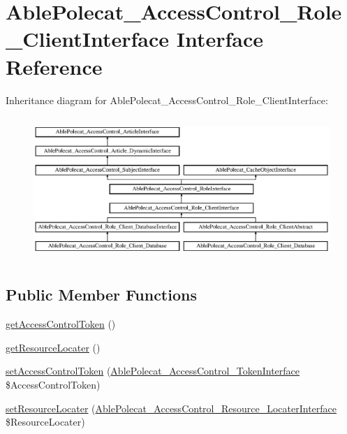 \hypertarget{interface_able_polecat___access_control___role___client_interface}{}\section{Able\+Polecat\+\_\+\+Access\+Control\+\_\+\+Role\+\_\+\+Client\+Interface Interface Reference}
\label{interface_able_polecat___access_control___role___client_interface}
Inheritance diagram for Able\+Polecat\+\_\+\+Access\+Control\+\_\+\+Role\+\_\+\+Client\+Interface\+:\begin{figure}[H]
\begin{center}
\leavevmode
\includegraphics[height=5.459610cm]{interface_able_polecat___access_control___role___client_interface}
\end{center}
\end{figure}
\subsection*{Public Member Functions}
\begin{DoxyCompactItemize}
\item 
\hyperlink{interface_able_polecat___access_control___role___client_interface_a47ac9d7ef686bd41f29563419360d10b}{get\+Access\+Control\+Token} ()
\item 
\hyperlink{interface_able_polecat___access_control___role___client_interface_a5016a8af80aa058cbfd360d00ebb6ce0}{get\+Resource\+Locater} ()
\item 
\hyperlink{interface_able_polecat___access_control___role___client_interface_a936fbc8779daa15334c3c23f9d0e79d6}{set\+Access\+Control\+Token} (\hyperlink{interface_able_polecat___access_control___token_interface}{Able\+Polecat\+\_\+\+Access\+Control\+\_\+\+Token\+Interface} \$Access\+Control\+Token)
\item 
\hyperlink{interface_able_polecat___access_control___role___client_interface_ac8f41684603c278abcc5055f8ffe0790}{set\+Resource\+Locater} (\hyperlink{interface_able_polecat___access_control___resource___locater_interface}{Able\+Polecat\+\_\+\+Access\+Control\+\_\+\+Resource\+\_\+\+Locater\+Interface} \$Resource\+Locater)
\end{DoxyCompactItemize}
